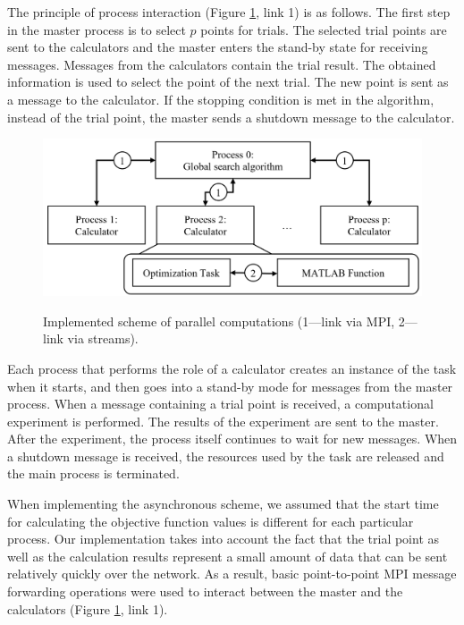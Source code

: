 \documentclass[mathematics,article,accept,pdftex,moreauthors]{Definitions/mdpi}
\begin{document}
	The principle of process interaction (Figure \ref{fig:Impl}, link 1) is as follows. The first step in the master process is to select $p$ points for trials. The selected trial points are sent to the calculators and the master enters the stand-by state for receiving messages. Messages from the calculators contain the trial result. The obtained information is used to select the point of the next trial. The new point is sent as a message to the calculator. If the stopping condition is met in the algorithm, instead of the trial point, the master sends a shutdown message to the calculator.
	\begin{figure}[H]
		{\includegraphics[width=0.9\linewidth]{fig2.JPG}}
		\caption{Implemented scheme of parallel computations (1---link via MPI, 2---link via streams).}\label{fig:Impl}
	\end{figure}   
	
	Each process that performs the role of a calculator creates an instance of the task when it starts, and then goes into a stand-by mode for messages from the master process. When a message containing a trial point is received, a computational experiment is performed. The results of the experiment are sent to the master. After the experiment, the process itself continues to wait for new messages. When a shutdown message is received, the resources used by the task are released and the main process is terminated.
	
	When implementing the asynchronous scheme, we assumed that the start time for calculating the objective function values is different for each particular process. Our implementation takes into account the fact that the trial point as well as the calculation results represent a small amount of data that can be sent relatively quickly over the network. As a result, basic point-to-point MPI message forwarding operations were used to interact between the master and the calculators (Figure \ref{fig:Impl}, link 1). 
	
\end{document}
